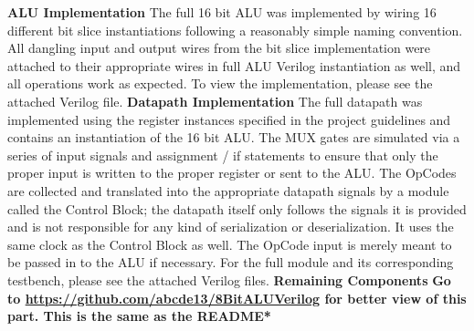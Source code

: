 \documentclass[12pt]{article}
\begin{document}
 \textbf{ALU Implementation}
 \newline \newline
The full 16 bit ALU was implemented by wiring 16 different bit slice instantiations following a reasonably simple 
naming convention. All dangling input and output wires from the bit slice implementation were attached to their 
appropriate wires in full ALU Verilog instantiation as well, and all operations work as expected. To view the 
implementation, please see the attached Verilog file. 
 \newline \newline
 \textbf{Datapath Implementation}
 \newline \newline
The full datapath was implemented using the register instances specified in the project guidelines and contains
an instantiation of the 16 bit ALU. The MUX gates are simulated via a series of input signals and assignment / if
statements to ensure that only the proper input is written to the proper register or sent to the ALU. The OpCodes
are collected and translated into the appropriate datapath signals by a module called the Control Block; the datapath 
itself only follows the signals it is provided and is not responsible for any kind of serialization or deserialization. It
uses the same clock as the Control Block as well. The OpCode input is merely meant to be passed in to the ALU
if necessary. For the full module and its corresponding testbench, please see the attached Verilog files. 
 \newline \newline
\textbf{Remaining Components}
\newline \newline
\textbf{Go to \url{https://github.com/abcde13/8BitALUVerilog} for better view of this part. This is the same as the README*}
\end{document}
